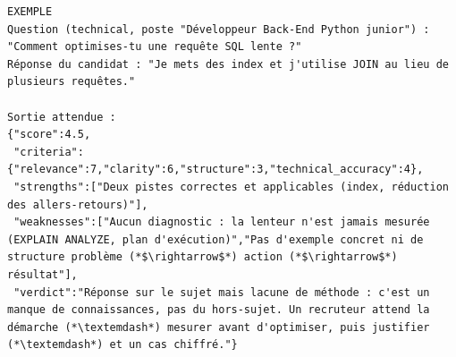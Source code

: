 \begin{lstlisting}[style=adamprompt]
EXEMPLE
Question (technical, poste "Développeur Back-End Python junior") :
"Comment optimises-tu une requête SQL lente ?"
Réponse du candidat : "Je mets des index et j'utilise JOIN au lieu de plusieurs requêtes."

Sortie attendue :
{"score":4.5,
 "criteria":{"relevance":7,"clarity":6,"structure":3,"technical_accuracy":4},
 "strengths":["Deux pistes correctes et applicables (index, réduction des allers-retours)"],
 "weaknesses":["Aucun diagnostic : la lenteur n'est jamais mesurée (EXPLAIN ANALYZE, plan d'exécution)","Pas d'exemple concret ni de structure problème (*$\rightarrow$*) action (*$\rightarrow$*) résultat"],
 "verdict":"Réponse sur le sujet mais lacune de méthode : c'est un manque de connaissances, pas du hors-sujet. Un recruteur attend la démarche (*\textemdash*) mesurer avant d'optimiser, puis justifier (*\textemdash*) et un cas chiffré."}
\end{lstlisting}
